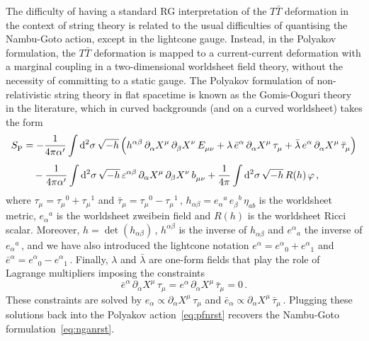 \documentclass[11pt]{article}
\newcommand{\be}{\begin{equation}}
\newcommand{\ee}{\end{equation}}
\newcommand{\p}{\partial}
\newcommand{\dd}{\mathrm{d}}
\begin{document}
The difficulty of having a standard RG interpretation of the $T\bar{T}$ deformation in the context of string theory is related to the usual difficulties of quantising the Nambu-Goto action, except in the lightcone gauge. Instead, in the Polyakov formulation, the $T\bar{T}$ deformation is mapped to a current-current deformation with a marginal coupling in a two-dimensional worldsheet field theory, without the necessity of committing to a static gauge.
The Polyakov formulation of non-relativistic string theory in flat spacetime is known as the Gomis-Ooguri theory~\cite{Gomis:2000bd} in the literature, which in curved backgrounds (and on a curved worldsheet) takes the form~\cite{Bergshoeff:2018yvt} 
%
\begin{align} \label{eq:pfnrst}
\begin{split}
    S^{}_\text{P} & = - \frac{1}{4\pi\alpha'} \int \dd^2\sigma \, \sqrt{-h} \, \Bigl( h^{\alpha\beta} \, \p^{}_\alpha X^\mu \, \p^{}_\beta X^\nu \, E^{}_{\mu\nu} + \lambda \, \bar{e}^\alpha \, \p^{}_\alpha X^\mu \, \tau^{}_\mu + \bar{\lambda} \, e^\alpha \, \p^{}_\alpha X^\mu \, \bar{\tau}^{}_\mu \Bigr) \\[4pt]
    & \quad - \frac{1}{4\pi\alpha'} \int \dd^2 \sigma \, \sqrt{-h} \, \varepsilon^{\alpha\beta} \, \p_\alpha X^\mu \, \p_\beta X^\nu \, b^{}_{\mu\nu} + \frac{1}{4\pi} \int \dd^2 \sigma \, \sqrt{-h} \, R(h) \, \varphi\,,
\end{split}
\end{align}
%
where $\tau_\mu = \tau_\mu{}^0 + \tau_\mu{}^1$ and $\bar{\tau}_\mu = \tau_\mu{}^0 - \tau_\mu{}^1$\,, $h^{}_{\alpha\beta} = e^{}_\alpha{}^a \, e^{}_\beta{}^b \, \eta_{ab}$ is the worldsheet metric, $e^{}_\alpha{}^a$ is the worldsheet zweibein field and $R(h)$ is the worldsheet Ricci scalar. Moreover, $h = \det (h_{\alpha\beta})$\,, $h^{\alpha\beta}$ is the inverse of $h^{}_{\alpha\beta}$ and $e^\alpha{}_a$ the inverse of $e^{}_\alpha{}^a$\,, and we have also introduced the lightcone notation $e^\alpha = e^\alpha{}^{}_0 + e^\alpha{}^{}_1$ and $\bar{e}^\alpha = e^\alpha{}^{}_0 - e^\alpha{}^{}_1$\,. 
Finally, $\lambda$ and $\bar{\lambda}$ are one-form fields that play the role of Lagrange multipliers imposing the constraints 
%
\be
    \bar{e}^\alpha \, \p^{}_\alpha X^\mu \, \tau^{}_\mu = e^\alpha \, \p^{}_\alpha X^\mu \, \bar{\tau}^{}_\mu = 0\,. 
\ee
%
These constraints are solved by $e^{}_\alpha \propto \p_\alpha X^\mu \, \tau^{}_\mu$ and $\bar{e}^{}_\alpha \propto \p_\alpha X^\mu \, \bar{\tau}^{}_\mu$\,. Plugging these solutions back into the Polyakov action~\eqref{eq:pfnrst} recovers the Nambu-Goto formulation~\eqref{eq:nganrst}.
\end{document}
